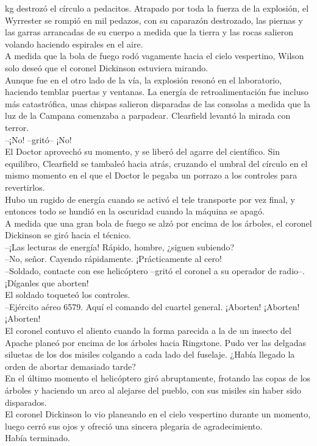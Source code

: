 kg destrozó el círculo a pedacitos. Atrapado por toda la fuerza de la
explosión, el Wyrrester se rompió en mil pedazos, con su caparazón
destrozado, las piernas y las garras arrancadas de su cuerpo a medida
que la tierra y las rocas salieron volando haciendo espirales en el
aire.\\
A medida que la bola de fuego rodó vagamente hacia el cielo vespertino,
Wilson solo deseó que el coronel Dickinson estuviera
mirando.\\[2\baselineskip]Aunque fue en el otro lado de la vía, la
explosión resonó en el laboratorio, haciendo temblar puertas y ventanas.
La energía de retroalimentación fue incluso más catastrófica, unas
chispas salieron disparadas de las consolas a medida que la luz de la
Campana comenzaba a parpadear. Clearfield levantó la mirada con
terror.\\
--¡No! --gritó-- ¡No!\\
El Doctor aprovechó su momento, y se liberó del agarre del científico.
Sin equilibro, Clearfield se tambaleó hacia atrás, cruzando el umbral
del círculo en el mismo momento en el que el Doctor le pegaba un porrazo
a los controles para revertirlos.\\
Hubo un rugido de energía cuando se activó el tele transporte por vez
final, y entonces todo se hundió en la oscuridad cuando la máquina se
apagó.\\[2\baselineskip]A medida que una gran bola de fuego se alzó por
encima de los árboles, el coronel Dickinson se giró hacia el técnico.\\
--¡Las lecturas de energía! Rápido, hombre, ¿siguen subiendo?\\
--No, señor. Cayendo rápidamente. ¡Prácticamente al cero!\\
--Soldado, contacte con ese helicóptero --gritó el coronel a su operador
de radio--. ¡Díganles que aborten!\\
El soldado toqueteó los controles.\\
--Ejército aéreo 6579. Aquí el comando del cuartel general. ¡Aborten!
¡Aborten! ¡Aborten!\\
El coronel contuvo el aliento cuando la forma parecida a la de un
insecto del Apache planeó por encima de los árboles hacia Ringstone.
Pudo ver las delgadas siluetas de los dos misiles colgando a cada lado
del fuselaje. ¿Había llegado la orden de abortar demasiado tarde?\\
En el último momento el helicóptero giró abruptamente, frotando las
copas de los árboles y haciendo un arco al alejarse del pueblo, con sus
misiles sin haber sido disparados.\\
El coronel Dickinson lo vio planeando en el cielo vespertino durante un
momento, luego cerró sus ojos y ofreció una sincera plegaria de
agradecimiento.\\
Había terminado.\\

